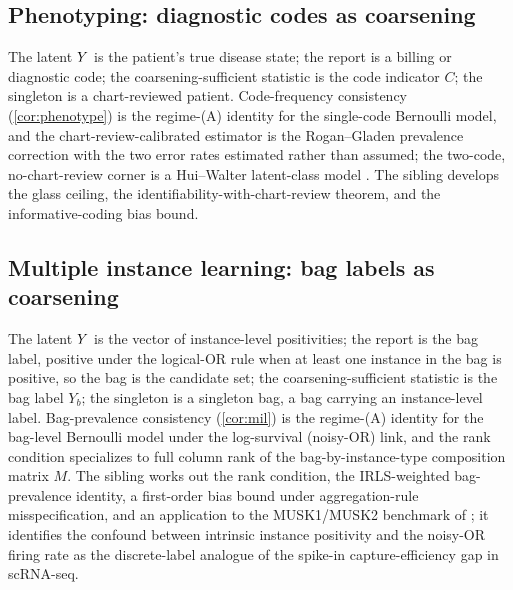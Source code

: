 \subsection{Phenotyping: diagnostic codes as coarsening}

The latent $Y$ is the patient's true disease state; the report is a
billing or diagnostic code; the coarsening-sufficient statistic is the
code indicator $C$; the singleton is a chart-reviewed patient.
Code-frequency consistency (\cref{cor:phenotype}) is the regime-(A)
identity for the single-code Bernoulli model, and the
chart-review-calibrated estimator is the Rogan--Gladen prevalence
correction \citep{rogan1978estimating} with the two error rates
estimated rather than assumed; the two-code, no-chart-review corner is a
Hui--Walter latent-class model \citep{hui1980estimating}. The sibling
\citep{towell2026phenotypecoarsening} develops the glass ceiling, the
identifiability-with-chart-review theorem, and the informative-coding
bias bound.

\subsection{Multiple instance learning: bag labels as coarsening}

The latent $Y$ is the vector of instance-level positivities; the report
is the bag label, positive under the logical-OR rule when at least one
instance in the bag is positive, so the bag is the candidate set; the
coarsening-sufficient statistic is the bag label $Y_b$; the singleton is
a singleton bag, a bag carrying an instance-level label. Bag-prevalence
consistency (\cref{cor:mil}) is the regime-(A) identity for the
bag-level Bernoulli model under the log-survival (noisy-OR) link, and the
rank condition specializes to full column rank of the
bag-by-instance-type composition matrix $M$. The sibling
\citep{towell2026milcoarsening} works out the rank condition, the
IRLS-weighted bag-prevalence identity, a first-order bias bound under
aggregation-rule misspecification, and an application to the MUSK1/MUSK2
benchmark of \citet{dietterich1997solving}; it identifies the confound
between intrinsic instance positivity and the
noisy-OR firing rate as the discrete-label analogue of the spike-in
capture-efficiency gap in scRNA-seq.
